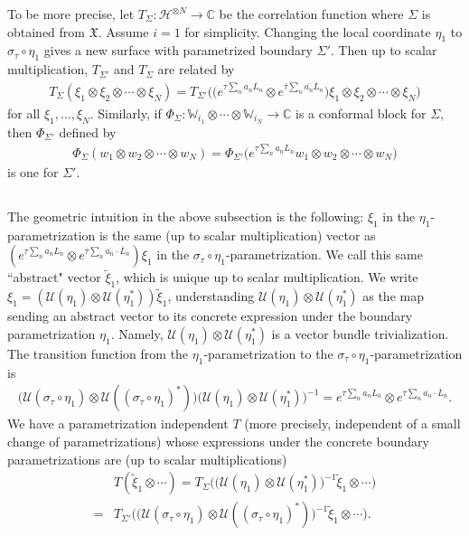 \documentclass[11pt,b5paper,notitlepage]{article}
\theoremstyle{definition}
\theoremstyle{plain}
\newcommand{\fk}{\mathfrak}
\newcommand{\mc}{\mathcal}
\newcommand{\wtd}{\widetilde}
\newcommand{\ovl}{\overline}
\newcommand{\Wbb}{\mathbb W}
\newcommand{\Cbb}{\mathbb C}
\numberwithin{equation}{section}
\begin{document}
To be more precise, let $T_\Sigma:\mc H^{\otimes N}\rightarrow\Cbb$ be the correlation function where $\Sigma$ is obtained from $\fk X$. Assume $i=1$ for simplicity. Changing the local coordinate $\eta_1$ to $\sigma_\tau\circ\eta_1$ gives a new surface with parametrized boundary $\Sigma'$. Then up to scalar multiplication, $T_{\Sigma'}$ and $T_\Sigma$ are related by
\begin{align}\label{eq12}
T_\Sigma(\xi_1\otimes\xi_2\otimes\cdots\otimes\xi_N)=T_{\Sigma'}\Big(\big(e^{\tau\sum_n a_nL_n}\otimes e^{\ovl\tau\sum_n\ovl{a_n}\ovl L_n}\big)\xi_1\otimes\xi_2\otimes\cdots\otimes\xi_N \Big)	
\end{align}
for all $\xi_1,\dots,\xi_N$. Similarly, if $\Phi_\Sigma:\Wbb_{i_1}\otimes\cdots\otimes\Wbb_{i_N}\rightarrow\Cbb$ is a conformal block for $\Sigma$, then $\Phi_{\Sigma'}$ defined by
\begin{align}\label{eq11}
\Phi_{\Sigma}(w_1\otimes w_2\otimes\cdots\otimes w_N)=\Phi_{\Sigma'}\big(e^{\tau\sum_n a_nL_n} w_1\otimes w_2\otimes\cdots\otimes w_N\big)	
\end{align}
is one for $\Sigma'$.




\subsection{}\label{lb15}

The geometric intuition in the above subsection is the following: $\xi_1$ in the $\eta_1$-parametrization is the same (up to scalar multiplication) vector as $(e^{\tau\sum_n a_nL_n}\otimes e^{\ovl \tau\sum_n \ovl {a_n}\cdot\ovl L_n})\xi_1$ in the $\sigma_\tau\circ\eta_1$-parametrization.  We call this same ``abstract" vector $\wtd\xi_1$, which is unique up to scalar multiplication. We write $\xi_1=(\mc U(\eta_1)\otimes\mc U(\eta_1^*))\wtd \xi_1$, understanding $\mc U(\eta_1)\otimes\mc U(\eta_1^*)$ as the map sending an abstract vector to its concrete expression under the boundary parametrization $\eta_1$. Namely, $\mc U(\eta_1)\otimes\mc U(\eta_1^*)$ is a vector bundle trivialization.  The transition function from the $\eta_1$-parametrization to the $\sigma_\tau\circ\eta_1$-parametrization is
\begin{align}
\big(\mc U(\sigma_\tau\circ\eta_1)\otimes\mc U((\sigma_\tau\circ\eta_1)^*)\big)\big(\mc U(\eta_1)\otimes\mc U(\eta_1^*)\big)^{-1}=e^{\tau\sum_n a_nL_n}\otimes e^{\ovl \tau\sum_n \ovl {a_n}\cdot\ovl L_n}.	
\end{align}
We have a parametrization independent $T$ (more precisely, independent of a small change of parametrizations)  whose expressions under the concrete boundary parametrizations are (up to scalar multiplications)
\begin{align*}
&T(\wtd\xi_1\otimes\cdots)=T_\Sigma\Big(\big(\mc U(\eta_1)\otimes\mc U(\eta_1^*)\big)^{-1}\wtd\xi_1\otimes\cdots\Big)\\
=&T_{\Sigma'}\Big(\big(\mc U(\sigma_\tau\circ\eta_1)\otimes\mc U((\sigma_\tau\circ\eta_1)^*)\big)^{-1}\wtd\xi_1\otimes\cdots\Big).
\end{align*}
\end{document}
